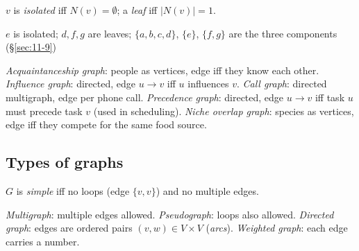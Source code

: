 \documentclass[11pt]{article}
\begin{document}
\begin{definition}
$v$ is \emph{isolated} iff $N(v)=\emptyset$; a \emph{leaf} iff $|N(v)|=1$.
\end{definition}

\begin{center}
\end{center}
\begin{center}
\small $e$ is isolated; $d,f,g$ are leaves; $\{a,b,c,d\}$, $\{e\}$, $\{f,g\}$ are the three components (\S\ref{sec:11-9})
\end{center}

\begin{note}
\emph{Acquaintanceship graph}: people as vertices, edge iff they know each other. \emph{Influence graph}: directed, edge $u\to v$ iff $u$ influences $v$. \emph{Call graph}: directed multigraph, edge per phone call. \emph{Precedence graph}: directed, edge $u\to v$ iff task $u$ must precede task $v$ (used in scheduling). \emph{Niche overlap graph}: species as vertices, edge iff they compete for the same food source.
\end{note}

\subsection{Types of graphs}
\label{sec:11-2}

\begin{definition}
$G$ is \emph{simple} iff no loops (edge $\{v,v\}$) and no multiple edges.
\end{definition}

\begin{note}
\emph{Multigraph}: multiple edges allowed. \emph{Pseudograph}: loops also allowed. \emph{Directed graph}: edges are ordered pairs $(v,w)\in V\times V$ (\emph{arcs}). \emph{Weighted graph}: each edge carries a number.
\end{note}
\end{document}
